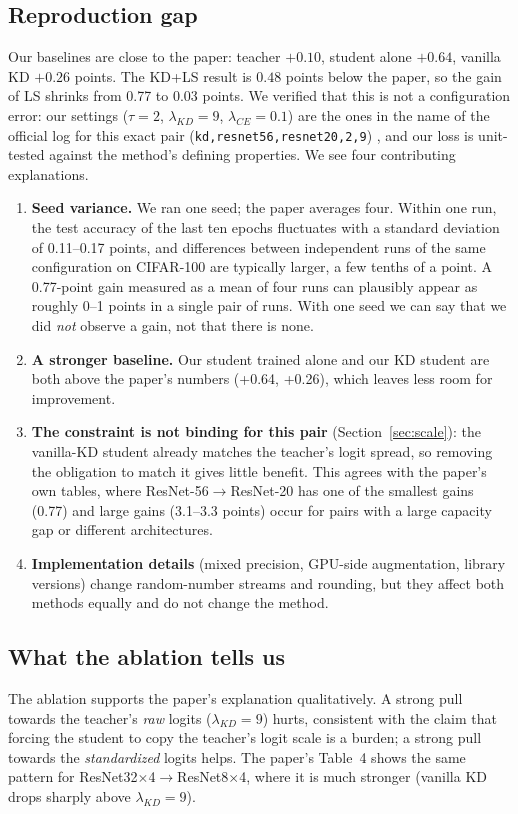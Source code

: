 \documentclass[12pt,a4paper]{article}
\begin{document}
\label{sec:disc}
\subsection{Reproduction gap}
Our baselines are close to the paper: teacher $+0.10$, student alone $+0.64$, vanilla KD $+0.26$ points. The KD+LS result is $0.48$ points below the paper, so the gain of LS shrinks from 0.77 to 0.03 points. We verified that this is not a configuration error: our settings ($\tau=2$, $\lambda_{KD}=9$, $\lambda_{CE}=0.1$) are the ones in the name of the official log for this exact pair (\texttt{kd,resnet56,resnet20,2,9}) \cite{sun2024code}, and our loss is unit-tested against the method's defining properties. We see four contributing explanations.
\begin{enumerate}[nosep]
\item \textbf{Seed variance.} We ran one seed; the paper averages four. Within one run, the test accuracy of the last ten epochs fluctuates with a standard deviation of 0.11--0.17 points, and differences between independent runs of the same configuration on CIFAR-100 are typically larger, a few tenths of a point. A 0.77-point gain measured as a mean of four runs can plausibly appear as roughly 0--1 points in a single pair of runs. With one seed we can say that we did \emph{not} observe a gain, not that there is none.
\item \textbf{A stronger baseline.} Our student trained alone and our KD student are both above the paper's numbers (+0.64, +0.26), which leaves less room for improvement.
\item \textbf{The constraint is not binding for this pair} (Section~\ref{sec:scale}): the vanilla-KD student already matches the teacher's logit spread, so removing the obligation to match it gives little benefit. This agrees with the paper's own tables, where ResNet-56$\rightarrow$ResNet-20 has one of the smallest gains (0.77) and large gains (3.1--3.3 points) occur for pairs with a large capacity gap or different architectures.
\item \textbf{Implementation details} (mixed precision, GPU-side augmentation, library versions) change random-number streams and rounding, but they affect both methods equally and do not change the method.
\end{enumerate}

\subsection{What the ablation tells us}
The ablation supports the paper's explanation qualitatively. A strong pull towards the teacher's \emph{raw} logits ($\lambda_{KD}=9$) hurts, consistent with the claim that forcing the student to copy the teacher's logit scale is a burden; a strong pull towards the \emph{standardized} logits helps. The paper's Table~4 shows the same pattern for ResNet32$\times$4$\rightarrow$ResNet8$\times$4, where it is much stronger (vanilla KD drops sharply above $\lambda_{KD}=9$).
\end{document}
